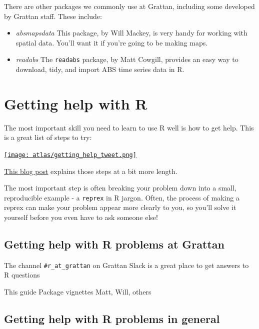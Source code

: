 \documentclass[
]{book}
\begin{document}
There are other packages we commonly use at Grattan, including some developed by Grattan staff. These include:

\begin{itemize}
\item
  \emph{absmapsdata} This package, by Will Mackey, is very handy for working with spatial data. You'll want it if you're going to be making maps.
\item
  \emph{readabs} The \texttt{readabs} package, by Matt Cowgill, provides an easy way to download, tidy, and import ABS time series data in R.
\end{itemize}

\hypertarget{getting-help-with-r}{%
\chapter{Getting help with R}\label{getting-help-with-r}}

The most important skill you need to learn to use R well is how to get help. This is a great list of steps to try:

\href{https://mobile.twitter.com/sctyner/status/1206986161434058752}{\texttt{[image: atlas/getting\_help\_tweet.png]}}

\href{https://sctyner.github.io/rhelp.html}{This blog post} explains those steps at a bit more length.

The most important step is often breaking your problem down into a small, reproducible example - a \texttt{reprex} in R jargon. Often, the process of making a reprex can make your problem appear more clearly to you, so you'll solve it yourself before you even have to ask someone else!

\hypertarget{getting-help-with-r-problems-at-grattan}{%
\section{Getting help with R problems at Grattan}\label{getting-help-with-r-problems-at-grattan}}

The channel \texttt{\#r\_at\_grattan} on Grattan Slack is a great place to get answers to R questions

This guide
Package vignettes
Matt, Will, others

\hypertarget{getting-help-with-r-problems-in-general}{%
\section{Getting help with R problems in general}\label{getting-help-with-r-problems-in-general}}
\end{document}
